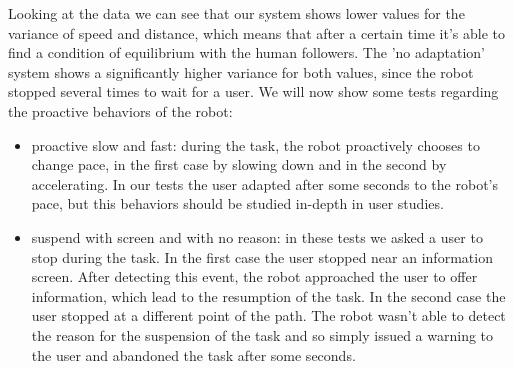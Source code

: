 Looking at the data we can see that our system shows lower values for the variance of speed and distance, which means that after a certain time it's able to find a condition of equilibrium with the human followers. The 'no adaptation' system shows a significantly higher variance for both values, since the robot stopped several times to wait for a user. We will now show some tests regarding the proactive behaviors of the robot:

\begin{itemize}
\item proactive slow and fast: during the task, the robot proactively chooses to change pace, in the first case by slowing down and in the second by accelerating. In our tests the user adapted after some seconds to the robot's pace, but this behaviors should be studied in-depth in user studies.
\item suspend with screen and with no reason: in these tests we asked a user to stop during the task. In the first case the user stopped near an information screen. After detecting this event, the robot approached the user to offer information, which lead to the resumption of the task. In the second case the user stopped at a different point of the path. The robot wasn't able to detect the reason for the suspension of the task and so simply   issued a warning to the user and abandoned the task after some seconds.
\end{itemize}





